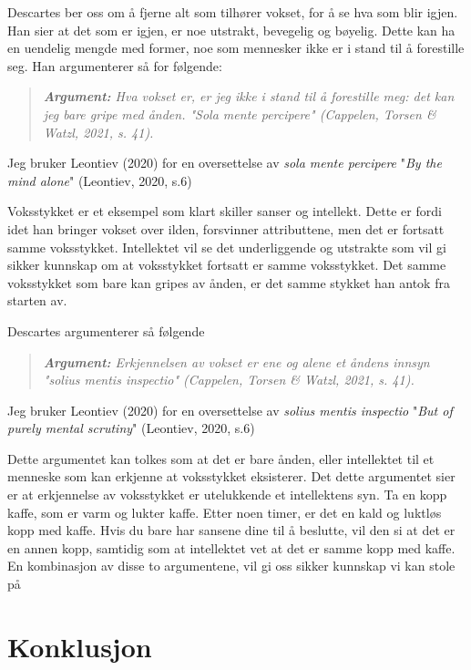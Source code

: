 \documentclass[11pt, a4paper]{article}
\newenvironment{argument}{\begin{quote}\itshape\textbf{Argument: }}{\end{quote}}
\begin{document}
Descartes ber oss om å fjerne alt som tilhører vokset, for å se hva som blir igjen. Han sier at det som er igjen, er noe utstrakt, bevegelig og bøyelig. Dette kan ha en uendelig mengde med former, noe som mennesker ikke er i stand til å forestille seg. Han argumenterer så for følgende:


\begin{argument}
    Hva vokset er, er jeg ikke i stand til å forestille meg: det kan jeg bare gripe med ånden. "\textit{Sola mente percipere}" (Cappelen, Torsen \& Watzl, 2021, s. 41). 
\end{argument}




Jeg bruker Leontiev (2020) for en oversettelse av \textit{sola mente percipere} "\textit{By the mind alone}" (Leontiev, 2020, s.6)


Voksstykket er et eksempel som klart skiller sanser og intellekt. Dette er fordi idet han bringer vokset over ilden, forsvinner attributtene, men det er fortsatt samme voksstykket. Intellektet vil se det underliggende og utstrakte som vil gi sikker kunnskap om at voksstykket fortsatt er samme voksstykket. Det samme voksstykket som bare kan gripes av ånden, er det samme stykket han antok fra starten av.

Descartes argumenterer så følgende

\begin{argument}
    Erkjennelsen av vokset er ene og alene et åndens innsyn "\textit{solius mentis inspectio}" (Cappelen, Torsen \& Watzl, 2021, s. 41). 
\end{argument}


Jeg bruker Leontiev (2020) for en oversettelse av \textit{solius mentis inspectio} "\textit{But of purely mental scrutiny}" (Leontiev, 2020, s.6)

Dette argumentet kan tolkes som at det er bare ånden, eller intellektet til et menneske som kan erkjenne at voksstykket eksisterer. Det dette argumentet sier er at erkjennelse av voksstykket er utelukkende et intellektens syn. Ta en kopp kaffe, som er varm og lukter kaffe. Etter noen timer, er det en kald og luktløs kopp med kaffe. Hvis du bare har sansene dine til å beslutte, vil den si at det er en annen kopp, samtidig som at intellektet vet at det er samme kopp med kaffe. En kombinasjon av disse to argumentene, vil gi oss sikker kunnskap vi kan stole på

\section{Konklusjon}
\end{document}
